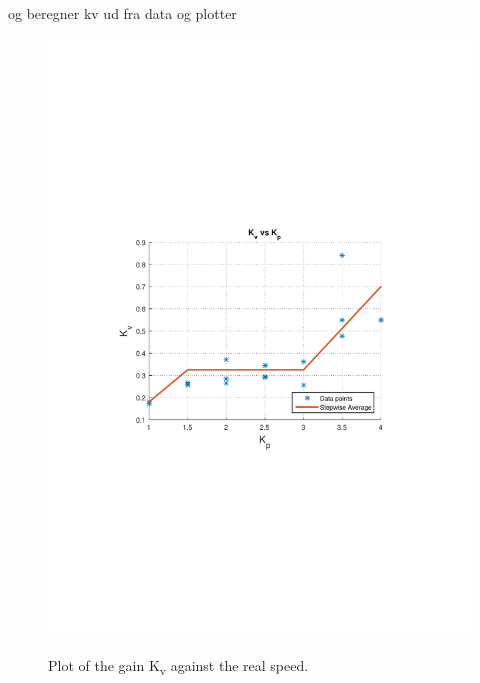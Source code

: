 og beregner kv ud fra data og plotter

\begin{figure}[H]
  \centering
  {
    \includegraphics[width=1.4\textwidth]{figures/KvKpSteeringtest.pdf}
  }
  \caption{Plot of the gain \si{K_v} against the real speed.}
  \label{steeringPlotSpeedVsGain}
\end{figure}
%

